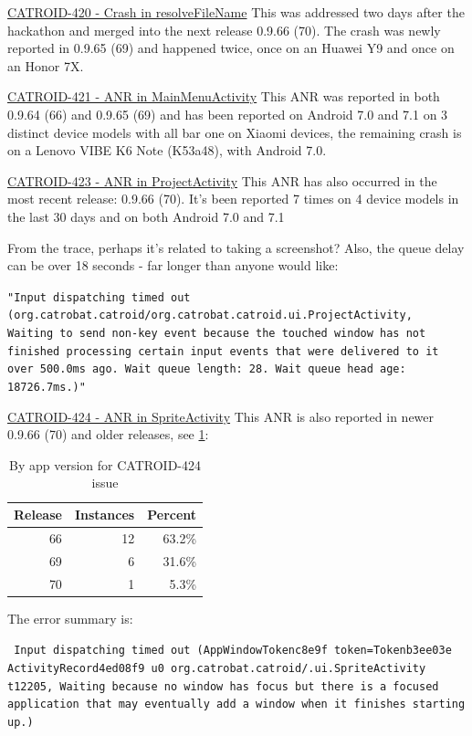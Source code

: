 \href{https://jira.catrob.at/browse/CATROID-420}{CATROID-420 - Crash in resolveFileName} This was addressed two days after the hackathon and merged into the next release 0.9.66 (70). The crash was newly reported in 0.9.65 (69) and happened twice, once on an Huawei Y9 and once on an Honor 7X.

\href{https://jira.catrob.at/browse/CATROID-421}{CATROID-421 - ANR in MainMenuActivity} This ANR was reported in both 0.9.64 (66) and 0.9.65 (69) and has been reported on Android 7.0 and 7.1 on 3 distinct device models with all bar one on Xiaomi devices, the remaining crash is on a Lenovo VIBE K6 Note (K53a48), with Android 7.0.

\href{https://jira.catrob.at/browse/CATROID-423}{CATROID-423 - ANR in ProjectActivity} This ANR has also occurred in the most recent release: 0.9.66 (70). It's been reported 7 times on 4 device models in the last 30 days and on both Android 7.0 and 7.1

From the trace, perhaps it's related to taking a screenshot? Also, the queue delay can be over 18 seconds - far longer than anyone would like:

\texttt{\footnotesize{"Input dispatching timed out \\(org.catrobat.catroid/org.catrobat.catroid.ui.ProjectActivity, \\Waiting to send non-key event because the touched window has not finished processing certain input events that were delivered to it over 500.0ms ago. Wait queue length: 28. Wait queue head age: 18726.7ms.)"}}

\href{https://jira.catrob.at/browse/CATROID-424}{CATROID-424 - ANR in SpriteActivity} This ANR is also reported in newer 0.9.66 (70) and older releases, see \ref{tab:catroid_424}:

\begin{table}[htbp!]
    \centering
    \begin{tabular}{r|r|r}
Release	&Instances	&Percent \\
\hline
66	&12	&63.2\% \\
69	&6	&31.6\% \\
70	&1	&5.3\% \\
    \end{tabular}
    \caption{By app version for CATROID-424 issue}
    \label{tab:catroid_424}
\end{table}

The error summary is:

\texttt{\footnotesize{
Input dispatching timed out (AppWindowToken{c8e9f token=Token{b3ee03e ActivityRecord{4ed08f9 u0 org.catrobat.catroid/.ui.SpriteActivity t12205}}}, Waiting because no window has focus but there is a focused application that may eventually add a window when it finishes starting up.)}}

